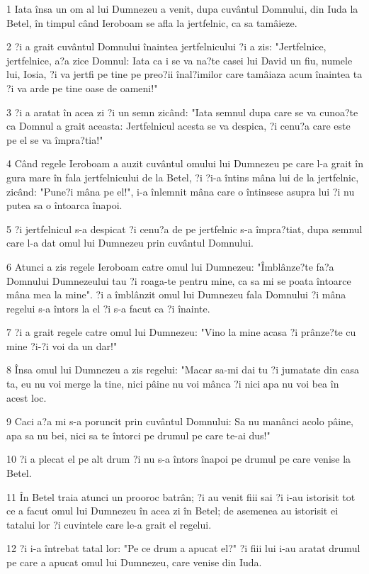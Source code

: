 \par 1 Iata însa un om al lui Dumnezeu a venit, dupa cuvântul Domnului, din Iuda la Betel, în timpul când Ieroboam se afla la jertfelnic, ca sa tamâieze.
\par 2 ?i a grait cuvântul Domnului înaintea jertfelnicului ?i a zis: "Jertfelnice, jertfelnice, a?a zice Domnul: Iata ca i se va na?te casei lui David un fiu, numele lui, Iosia, ?i va jertfi pe tine pe preo?ii înal?imilor care tamâiaza acum înaintea ta ?i va arde pe tine oase de oameni!"
\par 3 ?i a aratat în acea zi ?i un semn zicând: "Iata semnul dupa care se va cunoa?te ca Domnul a grait aceasta: Jertfelnicul acesta se va despica, ?i cenu?a care este pe el se va împra?tia!"
\par 4 Când regele Ieroboam a auzit cuvântul omului lui Dumnezeu pe care l-a grait în gura mare în fala jertfelnicului de la Betel, ?i ?i-a întins mâna lui de la jertfelnic, zicând: "Pune?i mâna pe el!", i-a înlemnit mâna care o întinsese asupra lui ?i nu putea sa o întoarca înapoi.
\par 5 ?i jertfelnicul s-a despicat ?i cenu?a de pe jertfelnic s-a împra?tiat, dupa semnul care l-a dat omul lui Dumnezeu prin cuvântul Domnului.
\par 6 Atunci a zis regele Ieroboam catre omul lui Dumnezeu: "Îmblânze?te fa?a Domnului Dumnezeului tau ?i roaga-te pentru mine, ca sa mi se poata întoarce mâna mea la mine". ?i a îmblânzit omul lui Dumnezeu fala Domnului ?i mâna regelui s-a întors la el ?i s-a facut ca ?i înainte.
\par 7 ?i a grait regele catre omul lui Dumnezeu: "Vino la mine acasa ?i prânze?te cu mine ?i-?i voi da un dar!"
\par 8 Însa omul lui Dumnezeu a zis regelui: "Macar sa-mi dai tu ?i jumatate din casa ta, eu nu voi merge la tine, nici pâine nu voi mânca ?i nici apa nu voi bea în acest loc.
\par 9 Caci a?a mi s-a poruncit prin cuvântul Domnului: Sa nu manânci acolo pâine, apa sa nu bei, nici sa te întorci pe drumul pe care te-ai dus!"
\par 10 ?i a plecat el pe alt drum ?i nu s-a întors înapoi pe drumul pe care venise la Betel.
\par 11 În Betel traia atunci un prooroc batrân; ?i au venit fiii sai ?i i-au istorisit tot ce a facut omul lui Dumnezeu în acea zi în Betel; de asemenea au istorisit ei tatalui lor ?i cuvintele care le-a grait el regelui.
\par 12 ?i i-a întrebat tatal lor: "Pe ce drum a apucat el?" ?i fiii lui i-au aratat drumul pe care a apucat omul lui Dumnezeu, care venise din Iuda.
